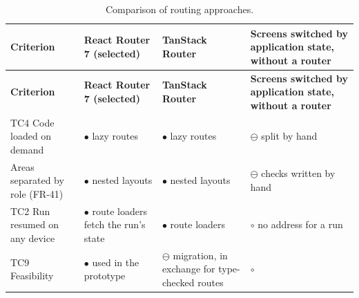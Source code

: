 {\small
\begin{longtable}{|>{\raggedright\arraybackslash}p{}|>{\raggedright\arraybackslash}p{}|>{\raggedright\arraybackslash}p{}|>{\raggedright\arraybackslash}p{}|}
\caption{Comparison of routing approaches.} \\
\hline
\textbf{Criterion} & \textbf{React Router 7 (selected)} & \textbf{TanStack Router\cite{r175}} & \textbf{Screens switched by application state, without a router} \\ \hline
\endfirsthead
\hline
\textbf{Criterion} & \textbf{React Router 7 (selected)} & \textbf{TanStack Router\cite{r175}} & \textbf{Screens switched by application state, without a router} \\ \hline
\endhead
TC4 Code loaded on demand & $\bullet$ lazy routes & $\bullet$ lazy routes & $\ominus$ split by hand \\ \hline
Areas separated by role (FR-41) & $\bullet$ nested layouts & $\bullet$ nested layouts & $\ominus$ checks written by hand \\ \hline
TC2 Run resumed on any device & $\bullet$ route loaders fetch the run's state\cite{r143} & $\bullet$ route loaders & $\circ$ no address for a run \\ \hline
TC9 Feasibility & $\bullet$ used in the prototype & $\ominus$ migration, in exchange for type-\allowbreak{}checked routes & $\circ$ \\ \hline
\end{longtable}
}

